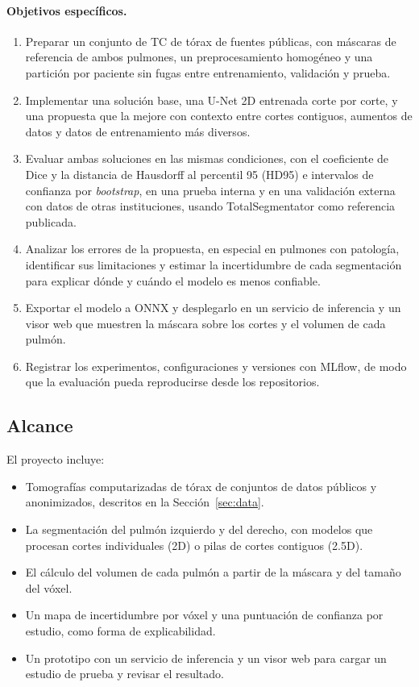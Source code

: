 \paragraph{Objetivos específicos.}
\begin{enumerate}
    \item Preparar un conjunto de TC de tórax de fuentes públicas, con máscaras
          de referencia de ambos pulmones, un preprocesamiento homogéneo y una
          partición por paciente sin fugas entre entrenamiento, validación y
          prueba.
    \item Implementar una solución base, una U-Net 2D entrenada corte por
          corte, y una propuesta que la mejore con contexto entre cortes
          contiguos, aumentos de datos y datos de entrenamiento más diversos.
    \item Evaluar ambas soluciones en las mismas condiciones, con el
          coeficiente de Dice y la distancia de Hausdorff al percentil 95
          (HD95) e intervalos de confianza por \textit{bootstrap}, en una
          prueba interna y en una validación externa con datos de otras
          instituciones, usando TotalSegmentator como referencia publicada.
    \item Analizar los errores de la propuesta, en especial en pulmones con
          patología, identificar sus limitaciones y estimar la incertidumbre de
          cada segmentación para explicar dónde y cuándo el modelo es menos
          confiable.
    \item Exportar el modelo a ONNX y desplegarlo en un servicio de inferencia
          y un visor web que muestren la máscara sobre los cortes y el volumen
          de cada pulmón.
    \item Registrar los experimentos, configuraciones y versiones con MLflow,
          de modo que la evaluación pueda reproducirse desde los
          repositorios.
\end{enumerate}

\subsection{Alcance}\label{sec:scope}
El proyecto incluye:

\begin{itemize}
    \item Tomografías computarizadas de tórax de conjuntos de datos públicos y
          anonimizados, descritos en la Sección~\ref{sec:data}.
    \item La segmentación del pulmón izquierdo y del derecho, con modelos que
          procesan cortes individuales (2D) o pilas de cortes contiguos
          (2.5D).
    \item El cálculo del volumen de cada pulmón a partir de la máscara y del
          tamaño del vóxel.
    \item Un mapa de incertidumbre por vóxel y una puntuación de confianza por
          estudio, como forma de explicabilidad.
    \item Un prototipo con un servicio de inferencia y un visor web para
          cargar un estudio de prueba y revisar el resultado.
\end{itemize}

